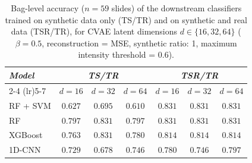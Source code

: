 \begin{table}[H]
\centering
\small
\caption{Bag-level accuracy ($n=59$ slides) of the downstream classifiers trained on synthetic data only (TS/TR) and on synthetic and real data (TSR/TR), for CVAE latent dimensions $d \in \{16, 32, 64\}$ ($\beta=0.5$, reconstruction = MSE, synthetic ratio: 1, maximum intensity threshold = 0.6).}
\label{tab:latent_dim_results}
\begin{tabular*}{\textwidth}{@{\extracolsep{\fill}}lcccccc}
\toprule
\multirow{2}{*}{\emph{Model}} & \multicolumn{3}{c}{\emph{TS/TR}} & \multicolumn{3}{c}{\emph{TSR/TR}} \\
\cmidrule(lr){2-4} \cmidrule(lr){5-7}
 & $d=16$ & $d=32$ & $d=64$ & $d=16$ & $d=32$ & $d=64$ \\
\midrule
RF + SVM & $0.627$ & $0.695$ & $0.610$ & $0.831$ & $0.831$ & $0.831$ \\
RF & $0.797$ & $0.831$ & $0.797$ & $0.831$ & $0.831$ & $0.831$ \\
XGBoost & $0.763$ & $0.831$ & $0.780$ & $0.814$ & $0.814$ & $0.814$ \\
1D-CNN & $0.729$ & $0.678$ & $0.746$ & $0.780$ & $0.746$ & $0.797$ \\
\bottomrule
\end{tabular*}
\end{table}
